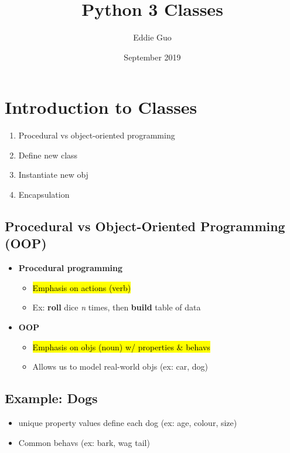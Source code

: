 \documentclass{article}
\title{Python 3 Classes}
\author{Eddie Guo}
\date{September 2019}
\begin{document}
\lstset{language=Python}
\maketitle

\section{Introduction to Classes}
    \begin{multicols}{2}
        \begin{enumerate}[label=(\roman*)]
            \item Procedural vs object-oriented programming
            \item Define new class
            \item Instantiate new obj
            \item Encapsulation
        \end{enumerate}
    \end{multicols}

\subsection{Procedural vs Object-Oriented Programming (OOP)}
    \begin{multicols}{2}
        \begin{itemize}
            \item \textbf{Procedural programming}
                \begin{itemize}
                    \item \hl{Emphasis on actions (verb)}
                    \item Ex: \textbf{roll} dice \textit{n} times, then \textbf{build} table of data
                \end{itemize}
            \item \textbf{OOP}
                \begin{itemize}
                    \item \hl{Emphasis on objs (noun) w/ properties \& behavs}
                    \item Allows us to model real-world objs (ex: car, dog)
                \end{itemize}
        \end{itemize}
    \end{multicols}


\subsection{Example: Dogs}
    \begin{multicols}{2}
        \begin{itemize}
            \item unique property values define each dog (ex: age, colour, size)
            \item Common behavs (ex: bark, wag tail)
        \end{itemize}
    \end{multicols}
\end{document}
